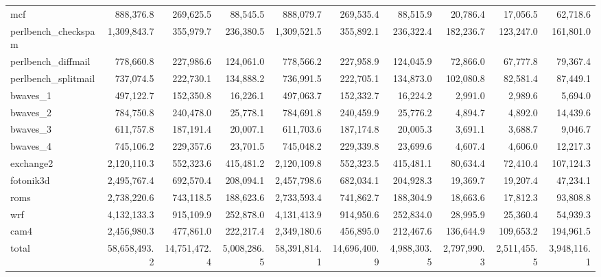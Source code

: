 \documentclass[10pt,a4paper]{article}
\begin{document}
{\begin{longtable}{@{}lrrrrrrrrr@{}}
mcf & 888,376.8 & 269,625.5 & 88,545.5 & 888,079.7 & 269,535.4 & 88,515.9 & 20,786.4 & 17,056.5 & 62,718.6 \\
perlbench\_checkspam & 1,309,843.7 & 355,979.7 & 236,380.5 & 1,309,521.5 & 355,892.1 & 236,322.4 & 182,236.7 & 123,247.0 & 161,801.0 \\
perlbench\_diffmail & 778,660.8 & 227,986.6 & 124,061.0 & 778,566.2 & 227,958.9 & 124,045.9 & 72,866.0 & 67,777.8 & 79,367.4 \\
perlbench\_splitmail & 737,074.5 & 222,730.1 & 134,888.2 & 736,991.5 & 222,705.1 & 134,873.0 & 102,080.8 & 82,581.4 & 87,449.1 \\
bwaves\_1 & 497,122.7 & 152,350.8 & 16,226.1 & 497,063.7 & 152,332.7 & 16,224.2 & 2,991.0 & 2,989.6 & 5,694.0 \\
bwaves\_2 & 784,750.8 & 240,478.0 & 25,778.1 & 784,691.8 & 240,459.9 & 25,776.2 & 4,894.7 & 4,892.0 & 14,439.6 \\
bwaves\_3 & 611,757.8 & 187,191.4 & 20,007.1 & 611,703.6 & 187,174.8 & 20,005.3 & 3,691.1 & 3,688.7 & 9,046.7 \\
bwaves\_4 & 745,106.2 & 229,357.6 & 23,701.5 & 745,048.2 & 229,339.8 & 23,699.6 & 4,607.4 & 4,606.0 & 12,217.3 \\
exchange2 & 2,120,110.3 & 552,323.6 & 415,481.2 & 2,120,109.8 & 552,323.5 & 415,481.1 & 80,634.4 & 72,410.4 & 107,124.3 \\
fotonik3d & 2,495,767.4 & 692,570.4 & 208,094.1 & 2,457,798.6 & 682,034.1 & 204,928.3 & 19,369.7 & 19,207.4 & 47,234.1 \\
roms & 2,738,220.6 & 743,118.5 & 188,623.6 & 2,733,593.4 & 741,862.7 & 188,304.9 & 18,663.6 & 17,812.3 & 93,808.8 \\
wrf & 4,132,133.3 & 915,109.9 & 252,878.0 & 4,131,413.9 & 914,950.6 & 252,834.0 & 28,995.9 & 25,360.4 & 54,939.3 \\
cam4 & 2,456,980.3 & 477,861.0 & 222,217.4 & 2,349,180.6 & 456,895.0 & 212,467.6 & 136,644.9 & 109,653.2 & 194,961.5 \\
\midrule
total & 58,658,493.2 & 14,751,472.4 & 5,008,286.5 & 58,391,814.1 & 14,696,400.9 & 4,988,303.5 & 2,797,990.3 & 2,511,455.5 & 3,948,116.1 \\
\end{longtable}
}
\end{document}
